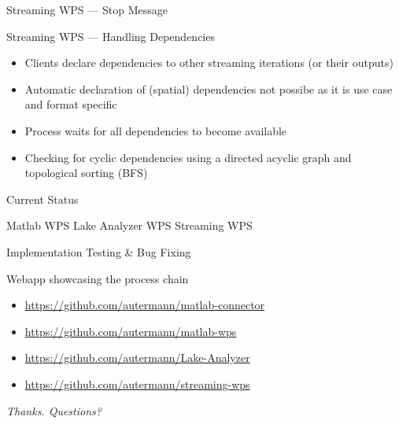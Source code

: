 \documentclass[xcolor=svgnames,professionalfonts,11pt,aspectratio=43,handout]{beamer}
\begin{document}
\begin{frame}[c,fragile]{Streaming WPS --- Stop Message}
    \begin{center}
      
    \end{center}
\end{frame}

\begin{frame}[t]{Streaming WPS --- Handling Dependencies}
  \begin{itemize}
    \item Clients declare dependencies to other streaming iterations (or their outputs)
    \item Automatic declaration of (spatial) dependencies not possibe as it is use case and format specific
    \item Process waits for all dependencies to become available
    \item Checking for cyclic dependencies using a directed acyclic graph and topological sorting (BFS)
  \end{itemize}
\end{frame}


\begin{frame}[t]{Current Status}
  \begin{itemize}
    \done Matlab WPS
    \done Lake Analyzer WPS
    \missing Streaming WPS
    \begin{itemize}
      \done Implementation
      \missing Testing \& Bug Fixing
    \end{itemize}
    \missing Webapp showcasing the process chain
  \end{itemize}
  \begin{itemize}
    \item \url{https://github.com/autermann/matlab-connector}
    \item \url{https://github.com/autermann/matlab-wps}
    \item \url{https://github.com/autermann/Lake-Analyzer}
    \item \url{https://github.com/autermann/streaming-wps}
  \end{itemize}
\end{frame}

\begin{frame}
  \vfill
  \begin{center}
    \emph{Thanks. Questions?}
  \end{center}
  \vfill
\end{frame}
\end{document}
